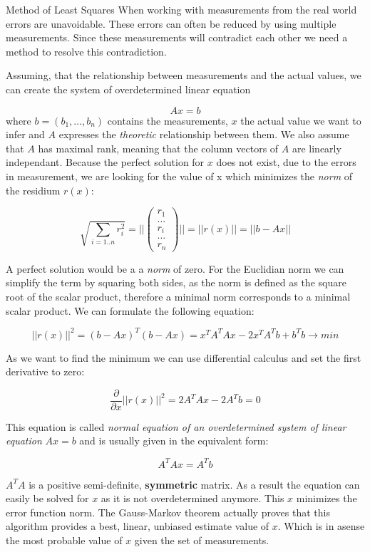 \begin{task}{Method of Least Squares\up*}{}{}
When working with measurements from the real world errors are
unavoidable. These errors can often be reduced by using multiple
measurements. Since these measurements will contradict each other we
need a method to resolve this contradiction.

Assuming, that the relationship between measurements and the actual
values, we can create the system of overdetermined linear equation

\[
Ax = b
\] where \(b = (b_1,\ldots,b_n)\) contains the measurements, \(x\)
the actual value we want to infer and \(A\) expresses the
\emph{theoretic} relationship between them. We also assume that \(A\)
has maximal rank, meaning that the column vectors of \(A\) are linearly
independant. Because the perfect solution for \(x\) does not exist, due
to the errors in measurement, we are looking for the value of x which
minimizes the \emph{norm} of the residium \(r(x)\):

\[
\sqrt{\sum_{i=1..n}{r_i^2}} = ||\begin{pmatrix}r_1\\...\\r_i\\...\\r_n\end{pmatrix}||=||r(x)|| = ||b-Ax||\]

A perfect solution would be a a \emph{norm} of zero. For the Euclidian
norm we can simplify the term by squaring both sides, as the norm is
defined as the square root of the scalar product, therefore a minimal
norm corresponds to a minimal scalar product. We can formulate the
following equation:

\[ || r(x) || ^2 =(b-Ax)^T(b-Ax) = x^T A^T Ax - 2x^T A^T b + b^T b \rightarrow min\]

As we want to find the minimum we can use differential calculus and set
the first derivative to zero:

\[\frac{\partial}{\partial x} ||r(x)||^2 = 2A^T Ax - 2 A^T b = 0\]

This equation is called \emph{normal equation of an overdetermined
  system of linear equation} \(Ax=b\) and is usually given in the
equivalent form:

\[A^T Ax = A^T b\]

\(A^T A\) is a positive semi-definite, \textbf{symmetric} matrix. As a
result the equation can easily be solved for \(x\) as it is not
overdetermined anymore. This \(x\) minimizes the error function norm.
The Gauss-Markov theorem actually proves that this algorithm provides a
best, linear, unbiased estimate value of \(x\). Which is in asense the
most probable value of \(x\) given the set of measurements.


\end{task}
